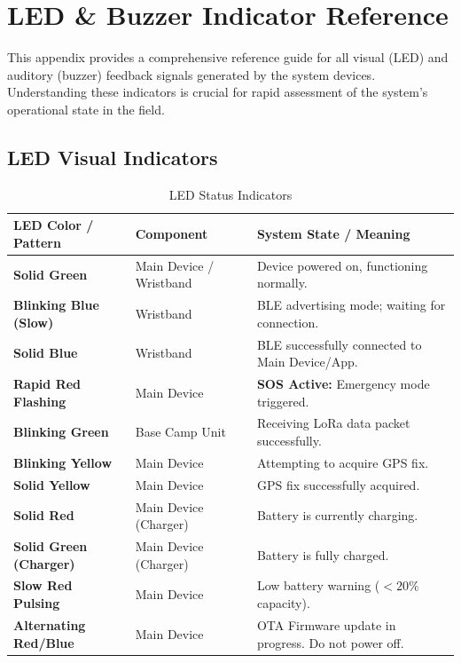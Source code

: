 \chapter{LED \& Buzzer Indicator Reference}
\label{app:indicators}

This appendix provides a comprehensive reference guide for all visual (LED) and auditory (buzzer) feedback signals generated by the system devices. Understanding these indicators is crucial for rapid assessment of the system's operational state in the field.

\section{LED Visual Indicators}

\begin{table}[htbp]
\centering
\caption{LED Status Indicators}
\label{tab:led-indicators}
\begin{tabular}{@{}lll@{}}
\toprule
\textbf{LED Color / Pattern} & \textbf{Component} & \textbf{System State / Meaning} \\ \midrule
\textbf{Solid Green} & Main Device / Wristband & Device powered on, functioning normally. \\
\textbf{Blinking Blue (Slow)} & Wristband & BLE advertising mode; waiting for connection. \\
\textbf{Solid Blue} & Wristband & BLE successfully connected to Main Device/App. \\
\textbf{Rapid Red Flashing} & Main Device & \textbf{SOS Active:} Emergency mode triggered. \\
\textbf{Blinking Green} & Base Camp Unit & Receiving LoRa data packet successfully. \\
\textbf{Blinking Yellow} & Main Device & Attempting to acquire GPS fix. \\
\textbf{Solid Yellow} & Main Device & GPS fix successfully acquired. \\
\textbf{Solid Red} & Main Device (Charger) & Battery is currently charging. \\
\textbf{Solid Green (Charger)} & Main Device (Charger) & Battery is fully charged. \\
\textbf{Slow Red Pulsing} & Main Device & Low battery warning ($< 20\%$ capacity). \\
\textbf{Alternating Red/Blue} & Main Device & OTA Firmware update in progress. Do not power off. \\
\bottomrule
\end{tabular}
\end{table}

